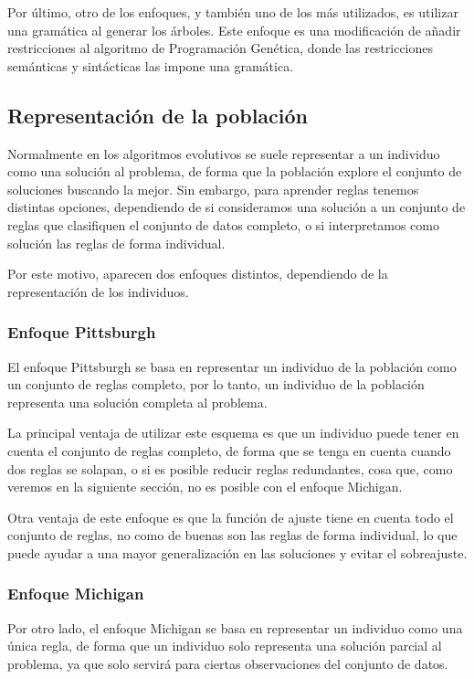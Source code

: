 Por último, otro de los enfoques, y también uno de los más utilizados, es utilizar una gramática al generar los árboles. Este enfoque es una modificación de añadir restricciones al algoritmo de Programación Genética, donde las restricciones semánticas y sintácticas las impone una gramática.



\subsection{Representación de la población}

Normalmente en los algoritmos evolutivos se suele representar a un individuo como una solución al problema, de forma que la población explore el conjunto de soluciones buscando la mejor. Sin embargo, para aprender reglas tenemos distintas opciones, dependiendo de si consideramos una solución a un conjunto de reglas que clasifiquen el conjunto de datos completo, o si interpretamos como solución las reglas de forma individual.

Por este motivo, aparecen dos enfoques distintos, dependiendo de la representación de los individuos.

\subsubsection{Enfoque Pittsburgh}

El enfoque Pittsburgh se basa en representar un individuo de la población como un conjunto de reglas completo, por lo tanto, un individuo de la población representa una solución completa al problema.

La principal ventaja de utilizar este esquema es que un individuo puede tener en cuenta el conjunto de reglas completo, de forma que se tenga en cuenta cuando dos reglas se solapan, o si es posible reducir reglas redundantes, cosa que, como veremos en la siguiente sección, no es posible con el enfoque Michigan.

Otra ventaja de este enfoque es que la función de ajuste tiene en cuenta todo el conjunto de reglas, no como de buenas son las reglas de forma individual, lo que puede ayudar a una mayor generalización en las soluciones y evitar el sobreajuste.

\subsubsection{Enfoque Michigan}

Por otro lado, el enfoque Michigan se basa en representar un individuo como una única regla, de forma que un individuo solo representa una solución parcial al problema, ya que solo servirá para ciertas observaciones del conjunto de datos.

